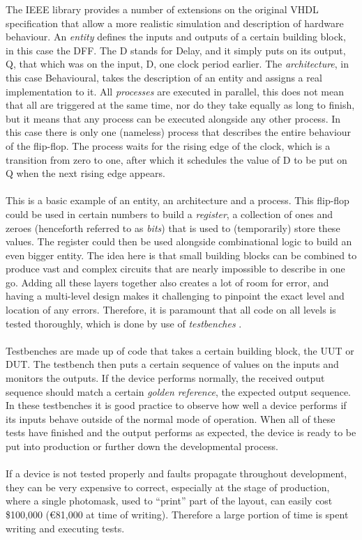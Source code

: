 \documentclass[11pt,british]{article}
\begin{document}
The \gls{IEEE} library provides a number of extensions on the original \gls{VHDL} specification that allow a more realistic simulation and description of hardware behaviour. An \emph{entity} defines the inputs and outputs of a certain building block, in this case the \gls{DFF}. The D stands for Delay, and it simply puts on its output, Q, that which was on the input, D, one clock period earlier. The \emph{architecture}, in this case Behavioural, takes the description of an entity and assigns a real implementation to it. All \emph{processes} are executed in parallel, this does not mean that all are triggered at the same time, nor do they take equally as long to finish, but it means that any process can be executed alongside any other process. In this case there is only one (nameless) process that describes the entire behaviour of the flip-flop. The process waits for the rising edge of the clock, which is a transition from zero to one, after which it schedules the value of D to be put on Q when the next rising edge appears.
\\
\\
This is a basic example of an entity, an architecture and a process. This flip-flop could be used in certain numbers to build a \emph{register}, a collection of ones and zeroes (henceforth referred to as \emph{bits}) that is used to (temporarily) store these values. The register could then be used alongside combinational logic to build an even bigger entity. The idea here is that small building blocks can be combined to produce vast and complex circuits that are nearly impossible to describe in one go. Adding all these layers together also creates a lot of room for error, and having a multi-level design makes it challenging to pinpoint the exact level and location of any errors. Therefore, it is paramount that all code on all levels is tested thoroughly, which is done by use of \emph{testbenches} \cite{bergeron00}.
\\
\\
Testbenches are made up of code that takes a certain building block, the \gls{UUT} or \gls{DUT}. The testbench then puts a certain sequence of values on the inputs and monitors the outputs. If the device performs normally, the received output sequence should match a certain \emph{golden reference}, the expected output sequence. In these testbenches it is good practice to observe how well a device performs if its inputs behave outside of the normal mode of operation. When all of these tests have finished and the output performs as expected, the device is ready to be put into production or further down the developmental process.
\\
\\
If a device is not tested properly and faults propagate throughout development, they can be very expensive to correct, especially at the stage of production, where a single photomask, used to ``print'' part of the layout, can easily cost \$100,000 (\euro81,000 at time of writing)\cite{weber06}. Therefore a large portion of time is spent writing and executing tests.
\end{document}
